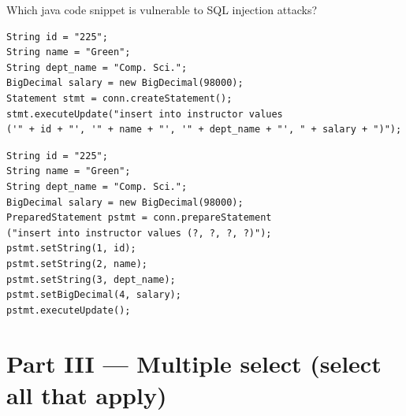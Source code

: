 \documentclass[12pt, addpoints, answers]{exam}
\begin{document}
\begin{questions}
\begin{minipage}{\linewidth}
\question[3]
Which java code snippet is vulnerable to SQL injection attacks?\par\vspace{0.5em}
\begin{checkboxes} 
    \CorrectChoice \begin{verbatim}
String id = "225";
String name = "Green";
String dept_name = "Comp. Sci.";
BigDecimal salary = new BigDecimal(98000);
Statement stmt = conn.createStatement();
stmt.executeUpdate("insert into instructor values 
('" + id + "', '" + name + "', '" + dept_name + "', " + salary + ")");
    \end{verbatim} %
    \choice \begin{verbatim}
String id = "225";
String name = "Green";
String dept_name = "Comp. Sci.";
BigDecimal salary = new BigDecimal(98000);
PreparedStatement pstmt = conn.prepareStatement
("insert into instructor values (?, ?, ?, ?)");
pstmt.setString(1, id);
pstmt.setString(2, name);
pstmt.setString(3, dept_name);
pstmt.setBigDecimal(4, salary);
pstmt.executeUpdate();
    \end{verbatim}
\end{checkboxes}
\end{minipage}\vspace{1em}

\section*{Part III — Multiple select (select all that apply)}


\end{questions}
\end{document}
